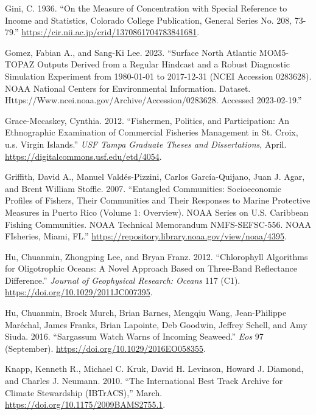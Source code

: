 \documentclass[
  letterpaper,
  oneside,
  open=any]{scrbook}
\newlength{\cslhangindent}
\newenvironment{CSLReferences}[2] %
 {\begin{list}{}{%
  \setlength{\itemindent}{0pt}
  \setlength{\leftmargin}{0pt}
  \setlength{\parsep}{0pt}
  \ifodd #1
   \setlength{\leftmargin}{\cslhangindent}
   \setlength{\itemindent}{-1\cslhangindent}
  \fi
  \setlength{\itemsep}{#2\baselineskip}}}
 {\end{list}}
\begin{document}
\begin{CSLReferences}{1}{0}
Gini, C. 1936. {``On the Measure of Concentration with Special Reference
to Income and Statistics, Colorado College Publication, General Series
No. 208, 73-79.''} \url{https://cir.nii.ac.jp/crid/1370861704783841681}.

Gomez, Fabian A., and Sang-Ki Lee. 2023. {``Surface North Atlantic
MOM5-TOPAZ Outputs Derived from a Regular Hindcast and a Robust
Diagnostic Simulation Experiment from 1980-01-01 to 2017-12-31 (NCEI
Accession 0283628). NOAA National Centers for Environmental Information.
Dataset. Https://Www.ncei.noaa.gov/Archive/Accession/0283628. Accessed
2023-02-19.''}

Grace-Mccaskey, Cynthia. 2012. {``Fishermen, Politics, and
Participation: An Ethnographic Examination of Commercial Fisheries
Management in St. Croix, u.s. Virgin Islands.''} \emph{USF Tampa
Graduate Theses and Dissertations}, April.
\url{https://digitalcommons.usf.edu/etd/4054}.

Griffith, David A., Manuel Valdés-Pizzini, Carlos García-Quijano, Juan
J. Agar, and Brent William Stoffle. 2007. {``Entangled Communities:
Socioeconomic Profiles of Fishers, Their Communities and Their Responses
to Marine Protective Measures in Puerto Rico (Volume 1: Overview). NOAA
Series on U.S. Caribbean Fishing Communities. NOAA Technical Memorandum
NMFS-SEFSC-556. NOAA FIsheries, Miami, FL.''}
\url{https://repository.library.noaa.gov/view/noaa/4395}.

Hu, Chuanmin, Zhongping Lee, and Bryan Franz. 2012. {``Chlorophyll
Algorithms for Oligotrophic Oceans: A Novel Approach Based on Three-Band
Reflectance Difference.''} \emph{Journal of Geophysical Research:
Oceans} 117 (C1). \url{https://doi.org/10.1029/2011JC007395}.

Hu, Chuanmin, Brock Murch, Brian Barnes, Mengqiu Wang, Jean-Philippe
Maréchal, James Franks, Brian Lapointe, Deb Goodwin, Jeffrey Schell, and
Amy Siuda. 2016. {``Sargassum Watch Warns of Incoming Seaweed.''}
\emph{Eos} 97 (September). \url{https://doi.org/10.1029/2016EO058355}.

Knapp, Kenneth R., Michael C. Kruk, David H. Levinson, Howard J.
Diamond, and Charles J. Neumann. 2010. {``The International Best Track
Archive for Climate Stewardship (IBTrACS),''} March.
\url{https://doi.org/10.1175/2009BAMS2755.1}.


\end{CSLReferences}
\end{document}
